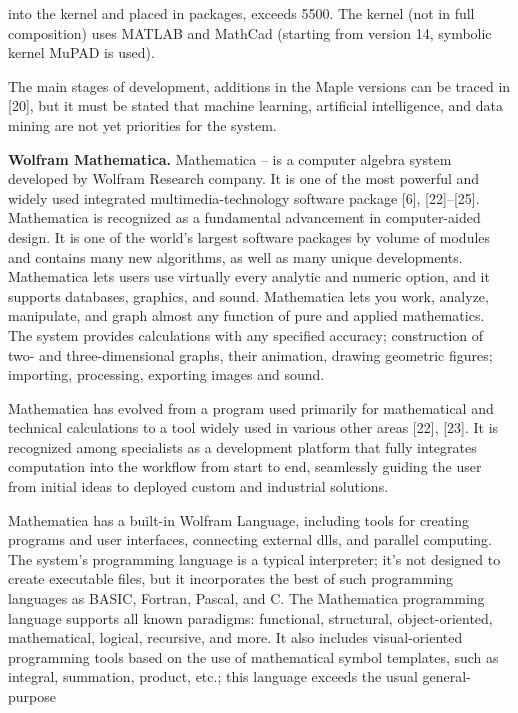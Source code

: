 \documentclass{article}
\begin{document}
\begin{multicols}{2}
\noindent into the kernel and placed in packages, exceeds 5500.
The kernel (not in full composition) uses MATLAB
and MathCad (starting from version 14, symbolic kernel
MuPAD is used).
\par
The main stages of development, additions in the
Maple versions can be traced in [20], but it must be
stated that machine learning, artificial intelligence, and
data mining are not yet priorities for the system.
\par
\textbf{Wolfram Mathematica.} Mathematica – is a computer
algebra system developed by Wolfram Research company. It is one of the most powerful and widely used
integrated multimedia-technology software package [6],
[22]–[25]. Mathematica is recognized as a fundamental
advancement in computer-aided design. It is one of
the world’s largest software packages by volume of
modules and contains many new algorithms, as well
as many unique developments. Mathematica lets users
use virtually every analytic and numeric option, and it
supports databases, graphics, and sound. Mathematica
lets you work, analyze, manipulate, and graph almost
any function of pure and applied mathematics. The
system provides calculations with any specified accuracy; construction of two- and three-dimensional graphs,
their animation, drawing geometric figures; importing,
processing, exporting images and sound.
\par
Mathematica has evolved from a program used primarily for mathematical and technical calculations to a
tool widely used in various other areas [22], [23]. It is
recognized among specialists as a development platform
that fully integrates computation into the workflow from
start to end, seamlessly guiding the user from initial ideas
to deployed custom and industrial solutions.
\par
Mathematica has a built-in Wolfram Language, including tools for creating programs and user interfaces,
connecting external dlls, and parallel computing. The
system’s programming language is a typical interpreter;
it’s not designed to create executable files, but it incorporates the best of such programming languages
as BASIC, Fortran, Pascal, and C. The Mathematica
programming language supports all known paradigms:
functional, structural, object-oriented, mathematical, logical, recursive, and more. It also includes visual-oriented
programming tools based on the use of mathematical
symbol templates, such as integral, summation, product,
etc.; this language exceeds the usual general-purpose

\end{multicols}
\end{document}
